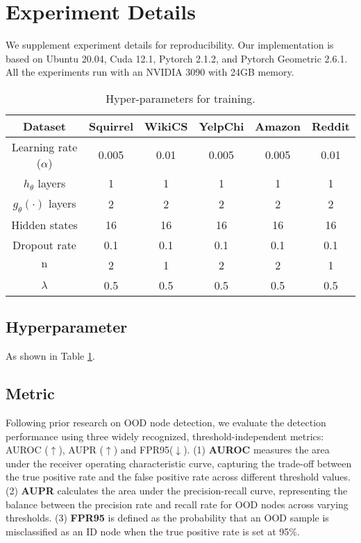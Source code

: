 \section{Experiment Details}
We supplement experiment details for reproducibility. Our implementation is based on Ubuntu 20.04, Cuda 12.1, Pytorch 2.1.2, and Pytorch Geometric 2.6.1. All the experiments run with an NVIDIA 3090 with 24GB memory.

\begin{table}[!t]
\centering
\caption{Hyper-parameters for training.}\label{tabel-hyperparameters}
\scriptsize %
\setlength{\tabcolsep}{1.5mm} %
\begin{tabular}{c|c|c|c|c|c}
\hline
\hline
\textbf{Dataset} &\textbf{Squirrel} & \textbf{WikiCS} & \textbf{YelpChi} & \textbf{Amazon} & \textbf{Reddit}\\ 
\hline
Learning rate ($\alpha$) &0.005 &0.01 &0.005 &0.005 &0.01 \\
$h_{\theta}$ layers &1 &1 &1 &1 &1\\
$g_{\theta}(\cdot)$ layers &2 &2 &2 &2 &2\\
Hidden states &16 &16 &16 &16 &16\\
Dropout rate &0.1 &0.1 &0.1 &0.1 &0.1\\
$\mathrm{n}$ &2 &1 &2 &2 &1 \\
$\lambda$ &0.5 &0.5 &0.5 &0.5 &0.5 \\
\hline
\hline
\end{tabular}
\end{table}







\subsection{Hyperparameter}\label{subsec-appendix-hyperpm}
As shown in Table \ref{tabel-hyperparameters}.

\subsection{Metric}\label{sec-apdix-metric}
Following prior research on OOD node detection, we evaluate the detection performance using three widely recognized, threshold-independent metrics: AUROC ($\uparrow$), AUPR ($\uparrow$) and FPR95($\downarrow$). 
(1) \textbf{AUROC} measures the area under the receiver operating characteristic curve, capturing the trade-off between the true positive rate and the false positive rate across different threshold values.  
(2) \textbf{AUPR} calculates the area under the precision-recall curve, representing the balance between the precision rate and recall rate for OOD nodes across varying thresholds.  
(3) \textbf{FPR95} is defined as the probability that an OOD sample is misclassified as an ID node when the true positive rate is set at 95\%.



